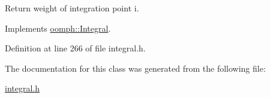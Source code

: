 Return weight of integration point i. 



Implements \hyperlink{classoomph_1_1Integral_ac65335e2aab120b285b3d6c294507b06}{oomph\+::\+Integral}.



Definition at line 266 of file integral.\+h.



The documentation for this class was generated from the following file\+:\begin{DoxyCompactItemize}
\item 
\hyperlink{integral_8h}{integral.\+h}\end{DoxyCompactItemize}
